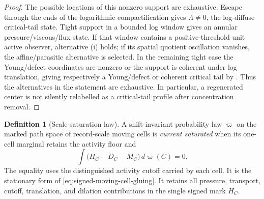 \documentclass[11pt]{amsart}
\numberwithin{equation}{section}
\theoremstyle{plain}
\theoremstyle{definition}
\newtheorem{definition}[definition]{Definition}
\theoremstyle{remark}
\begin{document}
\begin{proof}
The possible locations of this nonzero support are exhaustive.  Escape through
the ends of the logarithmic compactification gives \(\Lambda\ne0\), the
log-diffuse critical-tail state.  Tight support in a bounded log window gives
an annular pressure/viscous/flux state.  If that window contains a
positive-threshold unit active observer, alternative \textup{(i)} holds; if its
spatial quotient oscillation vanishes, the affine/parasitic alternative is
selected.  In the remaining tight case the Young/defect coordinates are
nonzero or the support is coherent under log translation, giving respectively
a Young/defect or coherent critical tail by
.
Thus the alternatives in the statement are exhaustive.  In particular, a
regenerated center is not silently relabelled as a critical-tail profile after
concentration removal.
\end{proof}

\begin{definition}[Scale-saturation law]
\label{def:scale-saturation-law}
A shift-invariant probability law \(\varpi\) on the marked path space of
record-scale moving cells is \emph{current saturated} when its one-cell
marginal retains the activity floor and
\begin{equation}\label{eq:scale-saturation-law}
 \int\bigl(H_C-D_C-M_C\bigr)\,d\varpi(C)=0.
\end{equation}
The equality uses the distinguished activity cutoff carried by each cell.  It
is the stationary form of \eqref{eq:signed-moving-cell-gluing}.  It retains
all pressure, transport, cutoff, translation, and dilation contributions in
the single signed mark \(H_C\).
\end{definition}
\end{document}
